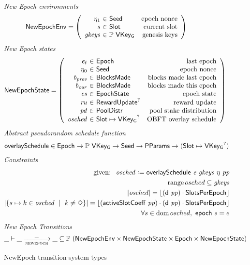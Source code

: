 \begin{figure}
  \emph{New Epoch environments}
  \begin{equation*}
    \NewEpochEnv =
    \left(
      \begin{array}{r@{~\in~}lr}
        \eta_1 & \Seed & \text{epoch nonce} \\
        \var{s} & \Slot & \text{current slot} \\
        \var{gkeys} & \powerset{\VKeyGen} & \text{genesis keys} \\
      \end{array}
    \right)
  \end{equation*}
  \emph{New Epoch states}
  \begin{equation*}
    \NewEpochState =
    \left(
      \begin{array}{r@{~\in~}lr}
        \var{e_\ell} & \Epoch & \text{last epoch} \\
        \eta_0 & \Seed & \text{epoch nonce} \\
        \var{b_{prev}} & \BlocksMade & \text{blocks made last epoch} \\
        \var{b_{cur}} & \BlocksMade & \text{blocks made this epoch} \\
        \var{es} & \EpochState & \text{epoch state} \\
        \var{ru} & \RewardUpdate^? & \text{reward update} \\
        \var{pd} & \PoolDistr & \text{pool stake distribution} \\
        \var{osched} & \Slot\mapsto\VKeyGen^? & \text{OBFT overlay schedule} \\
      \end{array}
    \right)
  \end{equation*}
  \emph{Abstract pseudorandom schedule function}
  \begin{align*}
    & \mathsf{overlaySchedule} \in \mathsf{Epoch} \to \mathbb{P}~\mathsf{VKey_G} \to \mathsf{Seed} \to \mathsf{PParams}
        \to (\mathsf{Slot}\mapsto\mathsf{VKey_G}^?) \\
  \end{align*}
  \emph{Constraints}
  \begin{align*}
    \text{ given: }~\mathit{osched}\mathrel{\mathop:}=\mathsf{overlaySchedule}~\mathit{e}~\mathit{gkeys}~{\eta}~\mathit{pp} \\
    \operatorname{range}{osched}\subseteq\mathit{gkeys} \\
    |\mathit{osched}| = \lfloor(\mathsf{d}~\mathit{pp})\cdot\mathsf{SlotsPerEpoch}\rfloor \\
    |\{s\mapsto k\in\mathit{osched}~\mid~k\neq\Diamond\}| =
    \lfloor(\mathsf{activeSlotCoeff}~ \mathit{pp})\cdot(\mathsf{d}~\mathit{pp})\cdot\mathsf{SlotsPerEpoch}\rfloor \\
    \forall s\in\operatorname{dom}{osched},~\mathsf{epoch}~\mathit{s}=e\\
  \end{align*}
  \emph{New Epoch Transitions}
  \begin{equation*}
    \_ \vdash \var{\_} \trans{newepoch}{\_} \var{\_} \subseteq
    \powerset (\NewEpochEnv \times \NewEpochState \times \Epoch \times \NewEpochState)
  \end{equation*}
  \caption{NewEpoch transition-system types}
  \label{fig:ts-types:newepoch}
\end{figure}

